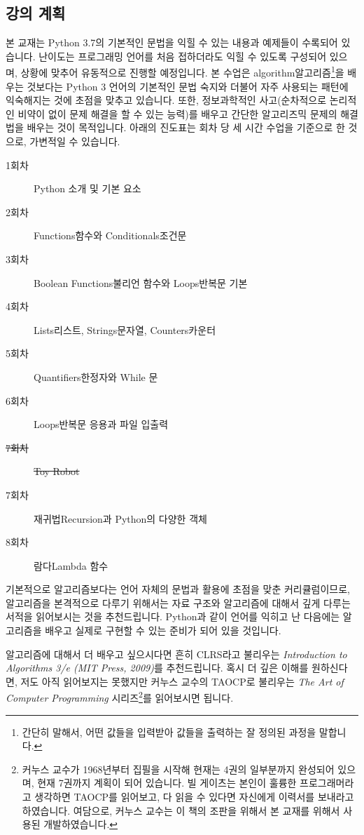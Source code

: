 \documentclass[../main.tex]{subfiles}
\begin{document}
\subsection{강의 계획}
본 교재는 Python 3.7의 기본적인 문법을 익힐 수 있는 내용과 예제들이 수록되어 있습니다.
난이도는 프로그래밍 언어를 처음 접하더라도 익힐 수 있도록 구성되어 있으며, 상황에 맞추어 유동적으로 진행할 예정입니다.
본 수업은 algorithm알고리즘\footnote{간단히 말해서, 어떤 값들을 입력받아 값들을 출력하는 잘 정의된 과정을 말합니다.}을 배우는 것보다는 Python 3 언어의 기본적인 문법 숙지와 더불어 자주 사용되는 패턴에 익숙해지는 것에 초점을 맞추고 있습니다.
또한, 정보과학적인 사고(순차적으로 논리적인 비약이 없이 문제 해결을 할 수 있는 능력)를 배우고 간단한 알고리즈믹 문제의 해결법을 배우는 것이 목적입니다.
아래의 진도표는 회차 당 세 시간 수업을 기준으로 한 것으로, 가변적일 수 있습니다.

\begin{description}
    \item[1회차] Python 소개 및 기본 요소
    \item[2회차] Functions함수와 Conditionals조건문
    \item[3회차] Boolean Functions불리언 함수와 Loops반복문 기본
    \item[4회차] Lists리스트, Strings문자열, Counters카운터
    \item[5회차] Quantifiers한정자와 While 문
    \item[6회차] Loops반복문 응용과 파일 입출력
    \item[\sout{7회차}] \sout{Toy Robot}
    \item[7회차] 재귀법Recursion과 Python의 다양한 객체
    \item[8회차] 람다Lambda 함수
\end{description}

기본적으로 알고리즘보다는 언어 자체의 문법과 활용에 초점을 맞춘 커리큘럼이므로, 알고리즘을 본격적으로 다루기 위해서는 자료 구조와 알고리즘에 대해서 깊게 다루는 서적을 읽어보시는 것을 추천드립니다.
Python과 같이 언어를 익히고 난 다음에는 알고리즘을 배우고 실제로 구현할 수 있는 준비가 되어 있을 것입니다.

알고리즘에 대해서 더 배우고 싶으시다면 흔히 CLRS라고 불리우는 \textit{Introduction to Algorithms 3/e (MIT Press, 2009)}를 추천드립니다.
혹시 더 깊은 이해를 원하신다면, 저도 아직 읽어보지는 못했지만 커누스 교수의 TAOCP로 불리우는 \textit{The Art of Computer Programming} 시리즈\footnote{커누스 교수가 1968년부터 집필을 시작해 현재는 4권의 일부분까지 완성되어 있으며, 현재 7권까지 계획이 되어 있습니다. 빌 게이츠는 본인이 훌륭한 프로그래머라고 생각하면 TAOCP를 읽어보고, 다 읽을 수 있다면 자신에게 이력서를 보내라고 하였습니다. 여담으로, 커누스 교수는 이 책의 조판을 위해서 본 교재를 위해서 사용된  개발하였습니다.}를 읽어보시면 됩니다.
\end{document}
